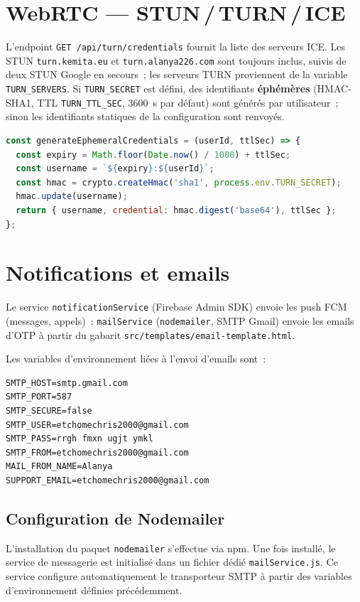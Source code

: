 \documentclass[11pt,a4paper,oneside]{report}
\begin{document}
\section{WebRTC --- STUN\,/\,TURN\,/\,ICE}
L'endpoint \texttt{GET /api/turn/credentials} fournit la liste des serveurs ICE.
Les STUN \texttt{turn.kemita.eu} et \texttt{turn.alanya226.com} sont toujours inclus, suivis de deux STUN Google en secours~; les serveurs TURN proviennent
de la variable \texttt{TURN\_SERVERS}. Si \texttt{TURN\_SECRET} est d\'{e}fini, des
identifiants \textbf{\'{e}ph\'{e}m\`{e}res} (HMAC-SHA1, TTL \texttt{TURN\_TTL\_SEC}, 3600~s par
d\'{e}faut) sont g\'{e}n\'{e}r\'{e}s par utilisateur~; sinon les identifiants statiques de la
configuration sont renvoy\'{e}s.

\begin{lstlisting}[language=JavaScript,caption={G\'{e}n\'{e}ration des identifiants TURN \'{e}ph\'{e}m\`{e}res (src/utils/turnCredentials.js)},captionpos=b]
const generateEphemeralCredentials = (userId, ttlSec) => {
  const expiry = Math.floor(Date.now() / 1000) + ttlSec;
  const username = `${expiry}:${userId}`;
  const hmac = crypto.createHmac('sha1', process.env.TURN_SECRET);
  hmac.update(username);
  return { username, credential: hmac.digest('base64'), ttlSec };
};
\end{lstlisting}

\section{Notifications et emails}
Le service \texttt{notificationService} (Firebase Admin SDK) envoie les push FCM
(messages, appels)~; \texttt{mailService} (\texttt{nodemailer}, SMTP Gmail) envoie
les emails d'OTP \`{a} partir du gabarit \texttt{src/templates/email-template.html}.

Les variables d'environnement li\'{e}es \`{a} l'envoi d'emails sont~:

\begin{lstlisting}[language=EnvFile,caption={Variables d'environnement pour l'envoi automatique des mails},captionpos=b]
SMTP_HOST=smtp.gmail.com
SMTP_PORT=587
SMTP_SECURE=false
SMTP_USER=etchomechris2000@gmail.com
SMTP_PASS=rrgh fmxn ugjt ymkl
SMTP_FROM=etchomechris2000@gmail.com
MAIL_FROM_NAME=Alanya
SUPPORT_EMAIL=etchomechris2000@gmail.com
\end{lstlisting}

\subsection{Configuration de Nodemailer}
L'installation du paquet \texttt{nodemailer} s'effectue via npm. Une fois install\'{e},
le service de messagerie est initialis\'{e} dans un fichier d\'{e}di\'{e}
\texttt{mailService.js}. Ce service configure automatiquement le transporteur SMTP
\`{a} partir des variables d'environnement d\'{e}finies pr\'{e}c\'{e}demment.
\end{document}
